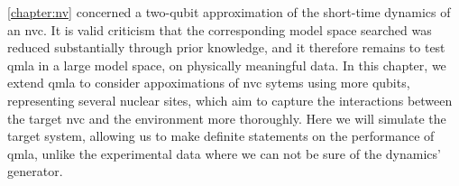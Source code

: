 \cref{chapter:nv} concerned a two-qubit approximation of the short-time dynamics of an \gls{nvc}. 
It is valid criticism that the corresponding \gls{model space} searched was reduced substantially through prior knowledge,
    and it therefore remains to test \gls{qmla} in a large model space, on physically meaningful data. 
In this chapter, we extend \gls{qmla} to consider appoximations of \gls{nvc} sytems using more qubits, 
    representing several nuclear sites, which aim to capture the interactions between the 
    target \gls{nvc} and the environment more thoroughly. 
Here we will simulate the target system, allowing us to make definite statements on the performance of \gls{qmla}, 
    unlike the experimental data where we can not be sure of the dynamics' generator.

\par 

